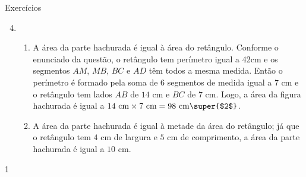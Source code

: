 \begin{answer}{Exercícios}
{\exerciselist
\begin{enumerate}\setcounter{enumi}{3}
\item 
\begin{enumerate}
\item A área da parte hachurada é igual à área do retângulo. Conforme o enunciado da questão, o retângulo tem perímetro igual a 42cm e os segmentos $AM$, $MB$, $BC$ e $AD$ têm todos a mesma medida. Então o perímetro é formado pela soma de 6 segmentos de medida igual a $7$ cm e o retângulo tem lados $AB$ de $14$ cm e $BC$ de $7$ cm. Logo, a área da figura hachurada é igual a $14\text{ cm}\times7\text{ cm}=98\text{ cm\super{$2$}}$.
\item A área da parte hachurada é igual à metade da área do retângulo; já que o retângulo tem $4$ cm de largura e $5$ cm de comprimento, a área da parte hachurada é igual a $10$ cm.
\end{enumerate}
\end{enumerate}
}{1}
\end{answer}
\exercise


